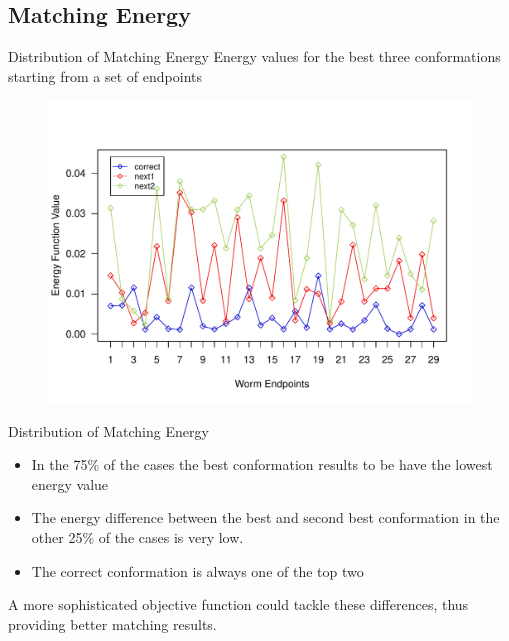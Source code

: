 \documentclass[xcolor=table]{beamer}
\begin{document}
\subsection{Matching Energy}
\begin{frame}{Distribution of Matching Energy}
Energy values for the best three conformations starting from a set of
endpoints
\begin{figure}[htp]
    \includegraphics[scale=0.5]{results/test2/energy-graph}
 \end{figure}
\end{frame}

\begin{frame}{Distribution of Matching Energy}
\begin{itemize}
\item In the 75\% of the cases the best conformation results to be have
the lowest energy value \pause
\item The energy difference between the best and second best conformation in the other 
  25\% of the cases is very low. \pause
\item The correct conformation is always one of the top two
\end{itemize}
 \vskip6pt

\pause A more sophisticated objective function could tackle these differences, thus providing
better matching results.
\end{frame}
\end{document}
